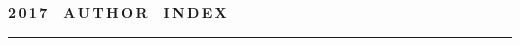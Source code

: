 

\def\stat{cont-e}
{%
\raggedleft\Large \bf%
2\,0\,1\,7\ \ A\,U\,T\,H\,O\,R\ \ I\,N\,D\,E\,X \vskip 17pt
 \hrule
 \par
{} }

\label{st\stat}

\def\tit{\ }

\def\aut{\ }
\def\auf{\ }

\def\leftkol{\ } %

\def\rightkol{\ } %

\titele{\tit}{\aut}{\auf}{\leftkol}{\rightkol}

\def\leftfootline{\small{\textbf{\thepage}
\hfill INFORMATIKA I EE PRIMENENIYA~--- INFORMATICS AND APPLICATIONS\ \ \ 2017\
\ \ volume~11\ \ \ issue\ 4}
}%
 \def\rightfootline{\small{INFORMATIKA I EE PRIMENENIYA~--- INFORMATICS AND APPLICATIONS\ \ \ 2017\ \ \ volume~11\ \ \ issue\ 4
\hfill \textbf{\thepage}}}

\vspace*{-12pt}
\vspace*{-18pt}

